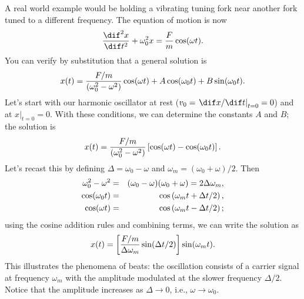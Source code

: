 \begin{sidebar}
 A real world example would be holding a vibrating tuning fork near another fork tuned to a different frequency.  The equation of motion is now
\begin{equation}\label{e.SHO-driven}
	\DDtt{x} + \omega_{0}^{2}x = \frac{F}{m}\cos(\wt).
\end{equation}
You can verify by substitution that a general solution is
\[
	x(t) = \frac{F/m}{(\omega_{0}^{2}-\omega^{2})}\cos(\omega t) + A\cos(\omega_{0} t)+B\sin(\omega_{0} t).
\]
Let's start with our harmonic oscillator at rest ($v_{0} = \left.\dif x/\dif t\right|_{t=0} = 0$) and at $\left. x\right|_{t=0} = 0$.  With these conditions, we can determine the constants $A$ and $B$; the solution is
\[
	x(t) = \frac{F/m}{(\omega_{0}^{2}-\omega^{2})}\left[\cos(\omega t)-\cos(\omega_{0} t)\right].
\]
Let's recast this by defining $\Delta = \omega_{0} - \omega$ and $\omega_{m} = (\omega_{0}+\omega)/2$.  Then
\begin{eqnarray*}
  \omega_{0}^{2}-\omega^{2} &=& (\omega_{0}-\omega)(\omega_{0}+\omega) = 2\Delta\omega_{m},\\
  \cos(\omega_{0} t) &=& \cos\left(\omega_{m} t+\Delta t/2\right),\\
  \cos(\omega t) &=& \cos\left(\omega_{m} t-\Delta t/2\right);
\end{eqnarray*}
using the cosine addition rules and combining terms, we can write the solution as
\begin{equation}\label{e.beats}
	x(t) = \left[\frac{F/m}{\Delta\omega_{m}}\sin(\Delta t/2)\right]\sin(\omega_{m} t).
\end{equation}
This illustrates the phenomena of beats: the oscillation consists of a carrier signal at frequency $\omega_{m}$ with the amplitude modulated at the slower frequency $\Delta /2$.  Notice that the amplitude increases as $\Delta \to0$, i.e., $\omega\to\omega_{0}$.


\end{sidebar}
